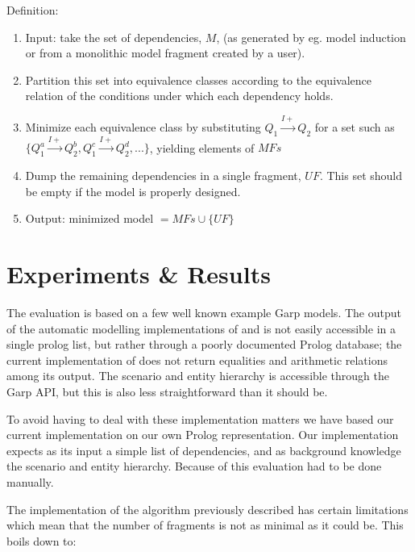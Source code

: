 \documentclass{article}
\begin{document}
Definition:

\begin{enumerate}

\item Input: take the set of dependencies, $M$, (as generated by eg. model
	induction or from a monolithic model fragment created by a user).  

\item Partition this set into equivalence classes according to the
	equivalence relation of the conditions under which each dependency holds.

\item Minimize each equivalence class by substituting 
	$Q_1 \overset{I+}{\rightarrow} Q_2 $ for a set such as 
	$ \{ Q_1^a \overset{I+}{\rightarrow} Q_2^b, Q_1^c \overset{I+}{\rightarrow} Q_2^d,  . . . \} $, 
	yielding elements of $MFs$

\item Dump the remaining dependencies in a single fragment, $UF$. 
	This set should be empty if the model is properly designed.

\item Output: minimized model $ = MFs \cup \{ UF \} $

\end{enumerate}

\section{Experiments \& Results}

The evaluation is based on a few well known example Garp models. The output of
the automatic modelling implementations of \cite{buisman} and \cite{vanweelden}
is not easily accessible in a single prolog list, but rather through a poorly
documented Prolog database; the current implementation of \cite{vanweelden}
does not return equalities and arithmetic relations among its output. The
scenario and entity hierarchy is accessible through the Garp API, but this is
also less straightforward than it should be. 

To avoid having to deal with these implementation matters we have based our
current implementation on our own Prolog representation. Our implementation
expects as its input a simple list of dependencies, and as background knowledge
the scenario and entity hierarchy. Because of this evaluation had to be done
manually.

The implementation of the algorithm previously described has certain
limitations which mean that the number of fragments is not as minimal as it
could be. This boils down to:
\end{document}
